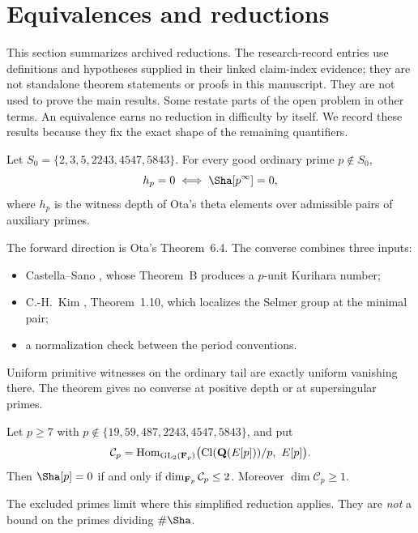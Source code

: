 \section{Equivalences and reductions}\label{sec:reductions}

This section summarizes archived reductions. The research-record entries use definitions and hypotheses supplied in their linked claim-index evidence; they are not standalone theorem statements or proofs in this manuscript. They are not used to prove the main results. Some restate parts of the open problem in other terms. An equivalence earns no reduction in difficulty by itself. We record these results because they fix the exact shape of the remaining quantifiers.

\begin{researchrecord}\label{thm:o1}
Let $S_0=\{2,3,5,2243,4547,5843\}$. For every good ordinary prime $p\notin S_0$,
\[
h_p=0\iff\Sha[p^\infty]=0 ,
\]
where $h_p$ is the witness depth of Ota's theta elements \cite{ota} over admissible pairs of auxiliary primes.
\end{researchrecord}
The forward direction is Ota's Theorem~6.4. The converse combines three inputs:
\begin{itemize}[leftmargin=*]
\item Castella--Sano \cite{castellasano}, whose Theorem~B produces a $p$-unit Kurihara number;
\item C.-H.~Kim \cite{kimch}, Theorem~1.10, which localizes the Selmer group at the minimal pair;
\item a normalization check between the period conventions.
\end{itemize}
Uniform primitive witnesses on the ordinary tail are exactly uniform vanishing there. The theorem gives no converse at positive depth or at supersingular primes.

\begin{researchrecord}\label{thm:divfield}\leavevmode\par
Let $p\ge7$ with $p\notin\{19,59,487,2243,4547,5843\}$, and put
\[
\mathcal C_p=\mathrm{Hom}_{\GL_2(\F_p)}\bigl(\mathrm{Cl}(\Q(E[p]))/p,\ E[p]\bigr).
\]
Then $\Sha[p]=0$ if and only if $\dim_{\mathbf{F}_p}\mathcal C_p\le2$. Moreover $\dim\mathcal C_p\ge1$.
\end{researchrecord}
The excluded primes limit where this simplified reduction applies. They are \emph{not} a bound on the primes dividing $\#\Sha$.

